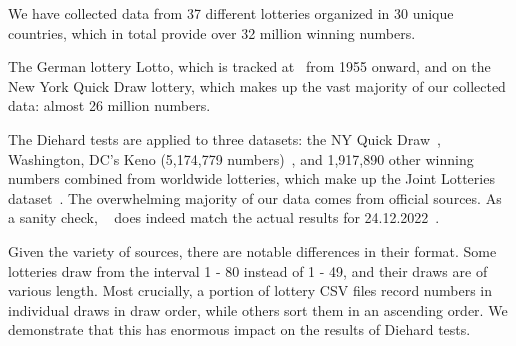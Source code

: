 We have collected data from 37 different lotteries organized in 30 unique countries, which in total provide over 32 million winning numbers.

The German lottery Lotto, which is tracked at~\cite{lottoarchive} from 1955 onward, and on the New York Quick Draw lottery, which makes up the vast majority of our collected data: almost 26 million numbers.

The Diehard tests are applied to three datasets: the NY Quick Draw~\cite{NYLotteries}, Washington, DC's Keno (5,174,779 numbers)~\cite{DCKeno}, and 1,917,890 other winning numbers combined from worldwide lotteries, which make up the Joint Lotteries dataset~\cite{SKLotteries, UKLotteries, AULotteries, Eurojackpot}. The overwhelming majority of our data comes from official sources. As a sanity check, ~\cite{lottoarchive} does indeed match the actual results for 24.12.2022~\cite{christmas_eve_lotto}.

Given the variety of sources, there are notable differences in their format. Some lotteries draw from the interval 1 - 80 instead of 1 - 49, and their draws are of various length. Most crucially, a portion of lottery CSV files record numbers in individual draws in draw order, while others sort them in an ascending order. We demonstrate that this has enormous impact on the results of Diehard tests.


